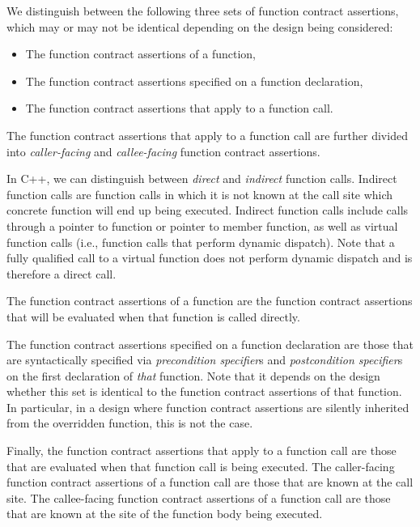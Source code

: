 We distinguish between the following three sets of function contract assertions, which may or may not be identical depending on the design being considered:

\begin{itemize}
\item The function contract assertions of a function,
\item The function contract assertions specified on a function declaration,
\item The function contract assertions that apply to a function call.
\end{itemize}

The function contract assertions that apply to a function call are further divided into  \emph{caller-facing} and \emph{callee-facing} function contract assertions.

In C++, we can distinguish between \emph{direct} and \emph{indirect} function calls. Indirect function calls are function calls in which it is not known at the call site which concrete function will end up being executed. Indirect function calls include calls through a pointer to function or pointer to member function, as well as virtual function calls (i.e., function calls that perform dynamic dispatch). Note that a fully qualified call to a virtual function does not perform dynamic dispatch and is therefore a direct call.

The function contract assertions of a function are the function contract assertions that will be evaluated when that function is called directly.

The function contract assertions specified on a function declaration are those that are syntactically specified via \emph{precondition specifier}s and \emph{postcondition specifier}s on the first declaration of \emph{that} function. Note that it depends on the design whether this set is identical to the function contract assertions of that function. In particular, in a design where function contract assertions are silently inherited from the overridden function, this is not the case.

Finally, the function contract assertions that apply to a function call are those that are evaluated when that function call is being executed. The caller-facing function contract assertions of a function call are those that are known at the call site. The callee-facing function contract assertions of a function call are those that are known at the site of the function body being executed.

